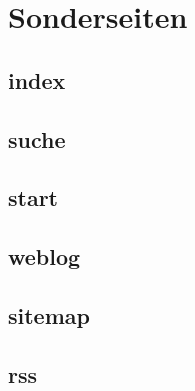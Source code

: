\label{kap:sonderseiten}
\chapter{Sonderseiten}


\label{sec:index}
\section{index}

\label{sec:suche}
\section{suche}

\label{sec:start}
\section{start}

\label{sec:weblog}
\section{weblog}

\label{sec:sitemap}
\section{sitemap}

\label{sec:rss}
\section{rss}
